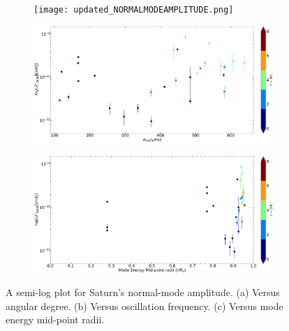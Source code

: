 \documentclass{article}
\begin{document}
\begin{figure}[htbp]
    \centering
    \begin{subfigure}[b]{0.5\linewidth}
        \centering
        \texttt{[image: updated\_NORMALMODEAMPLITUDE.png]}
        \caption{}
        \label{fig:amplitude_vs_degree}
    \end{subfigure}
    \hspace{0.5cm}
    \begin{subfigure}[b]{0.5\linewidth}
        \centering
        \includegraphics[width=\linewidth]{amplitude_PLUS_frequency.png}
        \caption{}
        \label{fig:amplitude_vs_frequency}
    \end{subfigure}
    \hspace{0.5cm}
    \begin{subfigure}[b]{0.5\linewidth}
        \centering
        \includegraphics[width=\linewidth]{normal_mode_RATIOPLOT.png}
        \caption{}
        \label{fig:normal_mode_RATIOPLOT}
    \end{subfigure}
    \caption{A semi-log plot for Saturn's normal-mode amplitude. (a) Versus angular degree. (b) Versus oscillation frequency. (c) Versus mode energy mid-point radii.}
    \label{fig:saturn_normal_mode_amplitude}
\end{figure}
\end{document}
